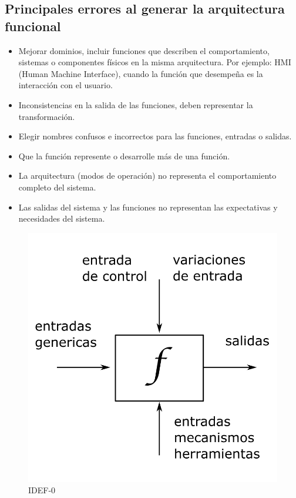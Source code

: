 \subsection{Principales errores al generar la arquitectura funcional}
\begin{itemize}
    \item Mejorar dominios, incluir funciones que describen el comportamiento, sistemas o componentes físicos en la misma arquitectura. Por ejemplo: HMI (Human Machine Interface), cuando la función que desempeña es la interacción con el usuario.
    \item Inconsistencias en la salida de las funciones, deben representar la transformación.
    \item Elegir nombres confusos e incorrectos para las funciones, entradas o salidas.
    \item Que la función represente o desarrolle más de una función.
    \item La arquitectura (modos de operación) no representa el comportamiento completo del sistema.
    \item Las salidas del sistema y las funciones no representan las expectativas y necesidades del sistema.
\end{itemize}

\begin{figure}[ht!]
    \centering
        \includegraphics[scale=0.30]{Proyecto Integrador Figuras/15 IDEF0.png}
        \caption{IDEF-0}
 \end{figure}

